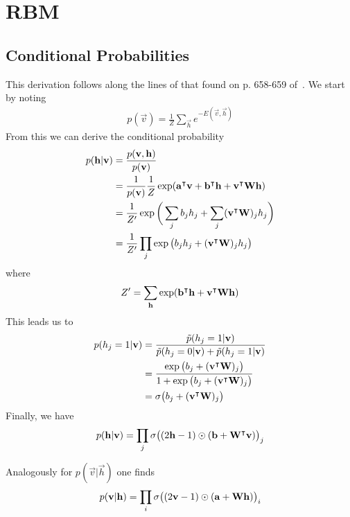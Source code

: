 \section{RBM}

\subsection{Conditional Probabilities}\label{app:conditional_probabilities_derivation}
This derivation follows along the lines of that found on p. 658-659 of~\cite{goodfellow_deep_learning}.
We start by noting
\begin{align}
    p(\vec{v}) = \frac{1}{Z} \sum_\vec{h} e^{-E(\vec{v},\vec{h})}
\end{align}
From this we can derive the conditional probability
\begin{align}
    p(\mathbf{h} | \mathbf{v})
        &= \frac{p(\mathbf{v},\mathbf{h})}{p(\mathbf{v})} \\
        &= \frac{1}{p(\mathbf{v})} \frac{1}{Z} \exp( \mathbf{a}^\intercal\mathbf{v} + \mathbf{b}^\intercal\mathbf{h} + \mathbf{v}^\intercal\mathbf{W}\mathbf{h} ) \\
        &= \frac{1}{Z'} \exp\bigg( \sum_j b_j h_j + \sum_j (\mathbf{v}^\intercal\mathbf{W})_j h_j \bigg) \\
        &= \frac{1}{Z'} \prod_j \exp\big( b_j h_j + (\mathbf{v}^\intercal\mathbf{W})_j h_j \big)
\end{align}
where
\begin{align}
    Z' = \sum_{\mathbf{h}} \exp( \mathbf{b}^\intercal\mathbf{h} + \mathbf{v}^\intercal\mathbf{W}\mathbf{h} )
\end{align}
This leads us to
\begin{align}
    p(h_j = 1 | \mathbf{v})
        &= \frac{\tilde{p}(h_j = 1 | \mathbf{v})}{\tilde{p}(h_j = 0 | \mathbf{v}) + \tilde{p}(h_j = 1 | \mathbf{v})} \\
        &= \frac{\exp\big( b_j + (\mathbf{v}^\intercal\mathbf{W})_j \big)}{1 + \exp\big( b_j + (\mathbf{v}^\intercal\mathbf{W})_j \big)} \\
        &= \sigma\big( b_j + (\mathbf{v}^\intercal\mathbf{W})_j \big)
\end{align}
Finally, we have
\begin{align}
    p(\mathbf{h} | \mathbf{v}) = \prod_j \sigma\big( (2\mathbf{h} - 1) \odot (\mathbf{b} + \mathbf{W}^\intercal\mathbf{v}) \big)_j
\end{align}

Analogously for \( p(\vec{v} | \vec{h}) \) one finds
\begin{align}
    p(\mathbf{v} | \mathbf{h}) = \prod_i \sigma\big( (2\mathbf{v} - 1) \odot (\mathbf{a} + \mathbf{W}\mathbf{h}) \big)_i
\end{align}

